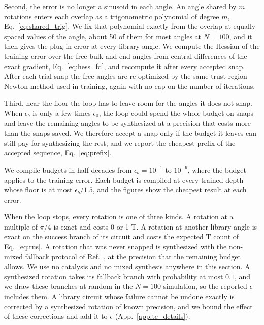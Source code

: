 Second, the error is no longer a sinusoid in each angle. An angle shared by $m$ rotations enters each overlap as a trigonometric polynomial of degree $m$, Eq.~\eqref{eq:shared_trig}. We fix that polynomial exactly from the overlap at equally spaced values of the angle, about 50 of them for most angles at $N = 100$, and it then gives the plug-in error at every library angle. We compute the Hessian of the training error over the free bulk and end angles from central differences of the exact gradient, Eq.~\eqref{eq:hess_fd}, and recompute it after every accepted snap. After each trial snap the free angles are re-optimized by the same trust-region Newton method used in training, again with no cap on the number of iterations.

Third, near the floor the loop has to leave room for the angles it does not snap. When $\epsilon_b$ is only a few times $\epsilon_0$, the loop could spend the whole budget on snaps and leave the remaining angles to be synthesized at a precision that costs more than the snaps saved. We therefore accept a snap only if the budget it leaves can still pay for synthesizing the rest, and we report the cheapest prefix of the accepted sequence, Eq.~\eqref{eq:prefix}.

We compile budgets in half decades from $\epsilon_b = 10^{-1}$ to $10^{-9}$, where the budget applies to the training error. Each budget is compiled at every trained depth whose floor is at most $\epsilon_b/1.5$, and the figures show the cheapest result at each error. 

When the loop stops, every rotation is one of three kinds. A rotation at a multiple of $\pi/4$ is exact and costs 0 or 1 T. A rotation at another library angle is exact on the success branch of its circuit and costs the expected T count of Eq.~\eqref{eq:rus}. A rotation that was never snapped is synthesized with the non-mixed fallback protocol of Ref.~\cite{Kliuchnikov2022}, at the precision that the remaining budget allows. We use no catalysis and no mixed synthesis anywhere in this section. A synthesized rotation takes its fallback branch with probability at most $0.1$, and we draw these branches at random in the $N = 100$ simulation, so the reported $\epsilon$ includes them. A library circuit whose failure cannot be undone exactly is corrected by a synthesized rotation of known precision, and we bound the effect of these corrections and add it to $\epsilon$ (App.~\ref{app:te_details}). 

